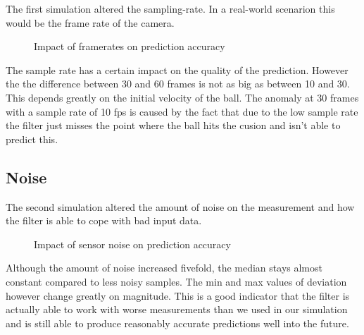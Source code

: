 \documentclass[notitlepage, a4paper, 11pt]{scrartcl}
\begin{document}
\begin{multicols}{2}
The first simulation altered the sampling-rate. In a real-world scenarion this would be the frame rate of the camera.

\begin{figure}[H]
    \centering
    \caption{Impact of framerates on prediction accuracy}
    \label{fig:framerate10}
\end{figure}

The sample rate has a certain impact on the quality of the prediction. However the the difference between 30 and 60 frames is not as big as between 10 and 30. 
This depends greatly on the initial velocity of the ball. The anomaly at 30 frames with a sample rate of 10 fps is caused by the fact that due to the low sample rate 
the filter just misses the point where the ball hits the cusion and isn't able to predict this.

\subsection{Noise}

The second simulation altered the amount of noise on the measurement and how the filter is able to cope with bad input data.

\begin{figure}[H]
    \centering
    \caption{Impact of sensor noise on prediction accuracy}
    \label{fig:noise2}
\end{figure}

Although the amount of noise increased fivefold, the median stays almost constant compared to less noisy samples. The min and max values of deviation however change greatly on magnitude.
This is a good indicator that the filter is actually able to work with worse measurements than we used in our simulation and is still able to produce reasonably accurate predictions well into the future.


\end{multicols}
\end{document}

